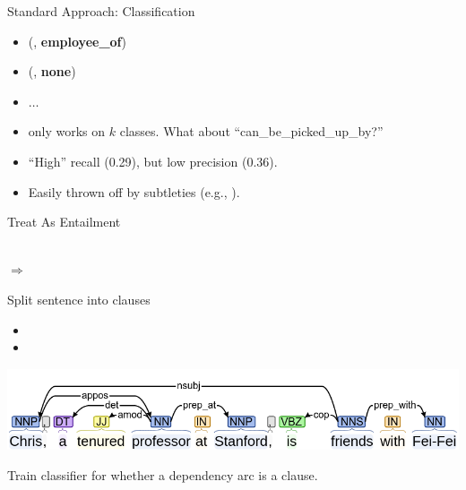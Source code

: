 \documentclass[hyperref]{beamer}
\begin{document}
\begin{frame}{Standard Approach: Classification}
\begin{itemize}
  \item (, \textbf{employee\_of})
  \item (, \textbf{none})
  \item $\dots$
\end{itemize}
\vspace{0.5cm}

\pause
\vspace{0.5cm}

\begin{itemize}
  \item only works on $k$ classes.
        What about ``can\_be\_picked\_up\_by?''
  \item ``High'' recall (0.29), but low precision (0.36).
  \item Easily thrown off by subtleties (e.g., ).
\end{itemize}
\end{frame}

\begin{frame}{Treat As Entailment}
\begin{center}
   \\ $\Rightarrow$ 
\end{center}

 Split sentence into clauses
\begin{itemize}
  \item[] 
  \item[] 
\end{itemize}
\pause

\begin{center}
  \includegraphics[scale=0.33]{../img/tree-chris-feifei.png}
\end{center}

 Train classifier for whether a dependency arc is a clause.

\end{frame}
\end{document}

